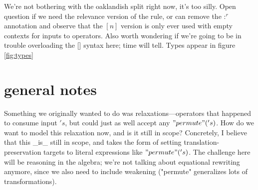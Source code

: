 \documentclass{article}
\begin{document}
We're not bothering with the oaklandish split right now, it's too
silly.  Open question if we need the relevance version of the rule, or
can remove the $:^r$ annotation and observe that the $[n]$ version is
only ever used with empty contexts for inputs to operators. Also worth
wondering if we're going to be in trouble overloading the [] syntax
here; time will tell. Types appear in figure \ref{fig:types}

\section{general notes}

Something we originally wanted to do was relaxations---operators that happened to consume input $'s$, but could just as well accept any $"permute"('s)$.  How do we want to model this relaxation now, and is it still in scope? Concretely, I believe that this _is_ still in scope, and takes the form of setting translation-preservation targets to literal expressions like $"permute"('s)$.  The challenge here will be reasoning in the algebra; we're not talking about equational rewriting anymore, since we also need to include weakening ("permute" generalizes lots of transformations). 
\end{document}
